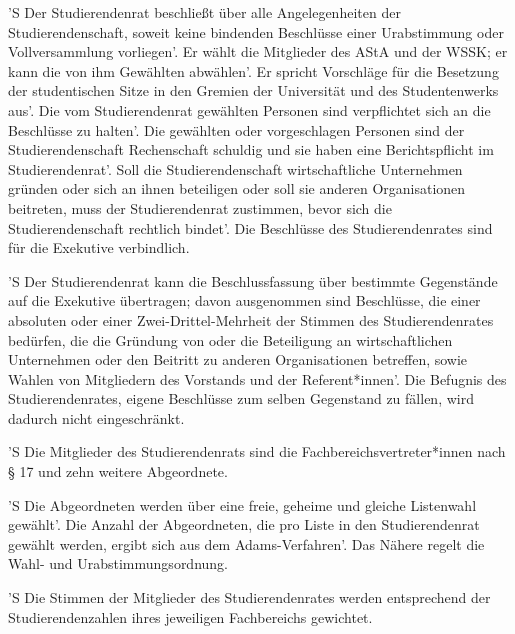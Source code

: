 \documentclass[fontsize=12pt,parskip=half]{scrartcl}
\begin{document}
\begin{contract}


  'S Der Studierendenrat beschließt über alle Angelegenheiten der
  Studierendenschaft, soweit keine bindenden Beschlüsse einer Urabstimmung oder
  Vollversammlung vorliegen'. Er wählt die Mitglieder des AStA und der WSSK; er
  kann die von ihm Gewählten abwählen'. Er spricht Vorschläge für die Besetzung
  der studentischen Sitze in den Gremien der Universität und des Studentenwerks
  aus'. Die vom Studierendenrat gewählten Personen sind verpflichtet sich an die
  Beschlüsse zu halten'. Die gewählten oder vorgeschlagen Personen sind der
  Studierendenschaft Rechenschaft schuldig und sie haben eine Berichtspflicht im
  Studierendenrat'. Soll die Studierendenschaft wirtschaftliche Unternehmen
  gründen oder sich an ihnen beteiligen oder soll sie anderen Organisationen
  beitreten, muss der Studierendenrat zustimmen, bevor sich die
  Studierendenschaft rechtlich bindet'. Die Beschlüsse des Studierendenrates sind
  für die Exekutive verbindlich.

  'S Der Studierendenrat kann die Beschlussfassung über bestimmte Gegenstände auf
  die Exekutive übertragen; davon ausgenommen sind Beschlüsse, die einer
  absoluten oder einer Zwei-Drittel-Mehrheit der Stimmen des Studierendenrates
  bedürfen, die die Gründung von oder die Beteiligung an wirtschaftlichen
  Unternehmen oder den Beitritt zu anderen Organisationen betreffen, sowie
  Wahlen von Mitgliedern des Vorstands und der Referent*innen'. Die Befugnis des
  Studierendenrates, eigene Beschlüsse zum selben Gegenstand zu fällen, wird
  dadurch nicht eingeschränkt.



  'S Die Mitglieder des Studierendenrats sind die Fachbereichsvertreter*innen nach
  § 17 und zehn weitere Abgeordnete.

  'S Die Abgeordneten werden über eine freie, geheime und gleiche Listenwahl
  gewählt'. Die Anzahl der Abgeordneten, die pro Liste in den Studierendenrat
  gewählt werden, ergibt sich aus dem Adams-Verfahren'. Das Nähere regelt die
  Wahl- und Urabstimmungsordnung.



  'S Die Stimmen der Mitglieder des Studierendenrates werden entsprechend der
  Studierendenzahlen ihres jeweiligen Fachbereichs gewichtet.


\end{contract}
\end{document}
